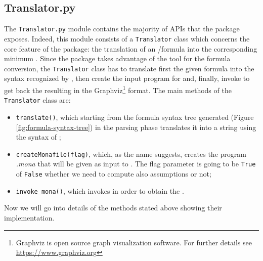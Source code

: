 \subsection{Translator.py}
The \texttt{Translator.py} module contains the majority of APIs that the \LTLfToDFA package exposes. Indeed, this module consists of a \texttt{Translator} class which concerns the core feature of the package: the translation of an \LTLf/\PLTL  formula into the corresponding minimum \DFA. Since the package takes advantage of the \MONA tool for the formula conversion, the \texttt{Translator} class has to translate first the given formula into the syntax recognized by \MONA, then create the input program for \MONA and, finally, invoke \MONA to get back the resulting \DFA in the Graphviz\footnote{Graphviz is open source graph visualization software. For further details see \href{https://www.graphviz.org}{https://www.graphviz.org}} format. 
The main methods of the \texttt{Translator} class are:
\begin{itemize}
\item \texttt{translate()}, which starting from the formula syntax tree generated (Figure \ref{fig:formula-syntax-tree}) in the parsing phase translates it into a string using the syntax of \MONA;
\item \texttt{createMonafile(flag)}, which, as the name suggests, creates the program \textit{.mona} that will be given as input to \MONA. The flag parameter is going to be \texttt{True} of \texttt{False} whether we need to compute also \declare  assumptions or not;
\item \texttt{invoke\_mona()}, which invokes \MONA in order to obtain the \DFA.
\end{itemize}
Now we will go into details of the methods stated above showing their implementation.
